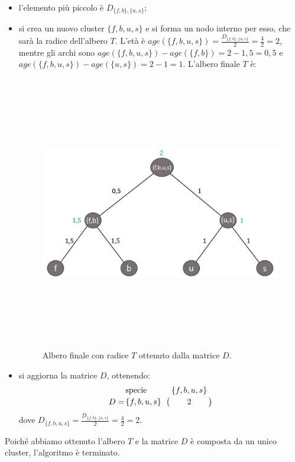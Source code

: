 \begin{itemize}
	\item l'elemento più piccolo è $D_{\{f, b\}, \{u, s\}}$;
	\item si crea un nuovo cluster $\{f, b, u, s\}$ e si forma un nodo interno per esso, che sarà la radice dell'albero $T$. L'età è $age(\{f, b, u, s\})=\frac{D_{\{f, b\}, \{u, s\}}}{2}=\frac{4}{2}=2$, mentre gli archi sono $age(\{f, b, u, s\})-age(\{f, b\})=2-1,5=0,5$ e $age(\{f, b, u, s\})-age(\{u, s\})=2-1=1$. 
	\newline
	L'albero finale $T$ è:
	\begin{figure}[h!]
\centering
	\includegraphics[height=12cm, width=14cm,keepaspectratio]{rooted_upgma_7.jpg}
 	\caption{Albero finale con radice $T$ ottenuto dalla matrice $D$.}
  	\label{fig:rooted_upgma_7}
  	\end{figure}
  	\item si aggiorna la matrice $D$, ottenendo:
  		\[
  		D = \bordermatrix{\text{specie}&\{f, b, u, s\}\cr
                \{f, b, u ,s\}& 2}
                \]
dove $D_{\{f, b, u, s\}}=\frac{D_{\{f, b\}, \{u, s\}}}{2}=\frac{4}{2}=2$.
\end{itemize}
Poiché abbiamo ottenuto l'albero $T$ e la matrice $D$ è composta da un unico cluster, l'algoritmo è terminato.

\newpage

